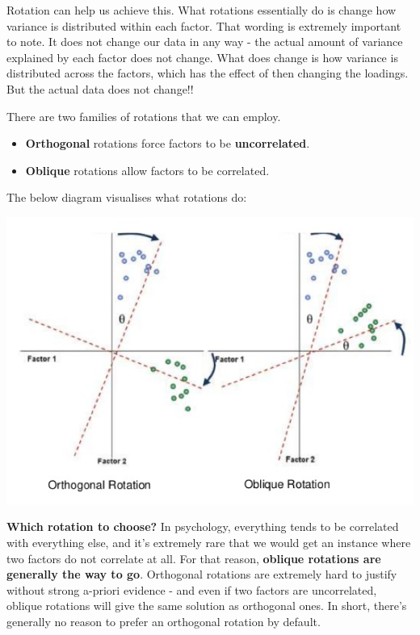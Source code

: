 \documentclass[
]{book}
\providecommand{\tightlist}{%
  \setlength{\itemsep}{0pt}\setlength{\parskip}{0pt}}
\begin{document}
Rotation can help us achieve this. What rotations essentially do is change how variance is distributed within each factor. That wording is extremely important to note. It does not change our data in any way - the actual amount of variance explained by each factor does not change. What does change is how variance is distributed across the factors, which has the effect of then changing the loadings. But the actual data does not change!!

There are two families of rotations that we can employ.

\begin{itemize}
\tightlist
\item
  \textbf{Orthogonal} rotations force factors to be \textbf{uncorrelated}.
\item
  \textbf{Oblique} rotations allow factors to be correlated.
\end{itemize}

The below diagram visualises what rotations do:

\includegraphics[width=8.69in]{img/rotations}

\textbf{Which rotation to choose?} In psychology, everything tends to be correlated with everything else, and it's extremely rare that we would get an instance where two factors do not correlate at all. For that reason, \textbf{oblique rotations are generally the way to go}. Orthogonal rotations are extremely hard to justify without strong a-priori evidence - and even if two factors are uncorrelated, oblique rotations will give the same solution as orthogonal ones. In short, there's generally no reason to prefer an orthogonal rotation by default.
\end{document}
